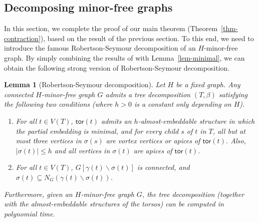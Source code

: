 \documentclass[a4paper,11pt]{article}
\newtheorem{lemma}{Lemma}
\numberwithin{lemma}{section}
\newcommand{\tor}{\mathsf{tor}}
\begin{document}
\subsection{Decomposing minor-free graphs}
In this section, we complete the proof of our main theorem (Theorem~\ref{thm-contraction}), based on the result of the previous section.
To this end, we need to introduce the famous Robertson-Seymour decomposition of an $H$-minor-free graph.
By simply combining the results of \cite{BandyapadhyayLLSJ22,DemaineHK05} with Lemma~\ref{lem-minimal}, we can obtain the following strong version of Robertson-Seymour decomposition.

\begin{lemma}[Robertson-Seymour decomposition] \label{lem-rsdecomp}
Let $H$ be a fixed graph.
Any connected $H$-minor-free graph $G$ admits a tree decomposition $(T,\beta)$ satisfying the following two conditions (where $h>0$ is a constant only depending on $H$).
\begin{enumerate}[label = (RS.\arabic*)]
    \item\label{item:rs-decomposition-1} For all $t \in V(T)$, $\tor(t)$ admits an $h$-almost-embeddable structure in which the partial embedding is minimal, and for every child $s$ of $t$ in $T$, all but at most three vertices in $\sigma(s)$ are vortex vertices or apices of $\tor(t)$.
    Also, $|\sigma(t)| \leq h$ and all vertices in $\sigma(t)$ are apices of $\tor(t)$.
    \item\label{item:rs-decomposition-2} For all $t \in V(T)$, $G[\gamma(t) \backslash \sigma(t)]$ is connected, and $\sigma(t) \subseteq N_G(\gamma(t) \backslash \sigma(t))$.
\end{enumerate}
Furthermore, given an $H$-minor-free graph $G$, the tree decomposition (together with the almost-embeddable structures of the torsos) can be computed in polynomial time.
\end{lemma}
\end{document}
